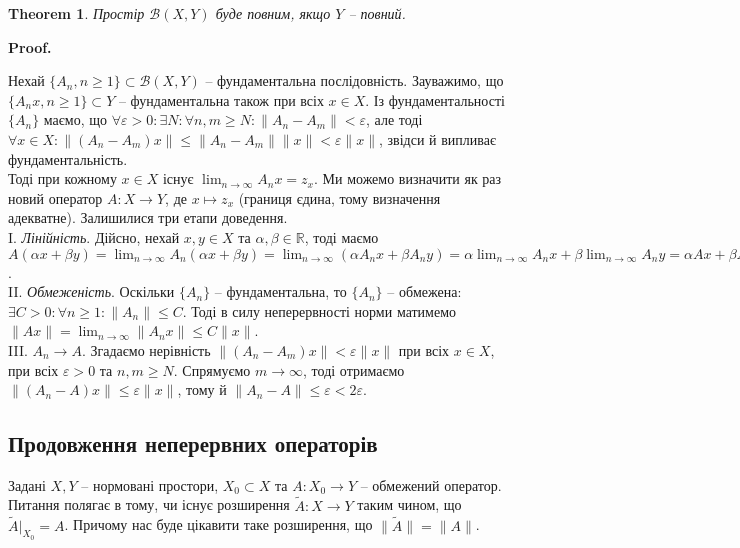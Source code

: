 \documentclass[a4paper, 10pt]{article}
\makeatletter
\theoremstyle{theoremdd}
\newtheorem{theorem}{Theorem}[subsection]
\theoremstyle{theoremdd}
\theoremstyle{theoremdd}
\theoremstyle{theoremdd}
\theoremstyle{theoremdd}
\theoremstyle{theoremdd}
\theoremstyle{theoremdd}
\theoremstyle{theoremdd}
\renewenvironment{proof}[1][Proof.\\]{\par
\pushQED{\hfill \qed}%
\normalfont \topsep6\p@\@plus6\p@\relax
\trivlist
\item\relax
{\bfseries
#1\@addpunct{.}}\hspace\labelsep\ignorespaces
}{%
\popQED\endtrivlist\@endpefalse
}
\makeatother
\begin{document}
\begin{theorem}
Простір $\mathcal{B}(X,Y)$ буде повним, якщо $Y$ -- повний.
\end{theorem}

\begin{proof}
Нехай $\{A_n, n \geq 1\} \subset \mathcal{B}(X,Y)$ -- фундаментальна послідовність. Зауважимо, що $\{A_nx, n \geq 1\} \subset Y$ -- фундаментальна також при всіх $x \in X$. Із фундаментальності $\{A_n\}$ маємо, що $\forall \varepsilon > 0: \exists N: \forall n,m \geq N: \|A_n-A_m\| < \varepsilon$, але тоді $\forall x \in X: \|(A_n-A_m)x\| \leq \|A_n-A_m\| \|x\| < \varepsilon \|x\|$, звідси й випливає фундаментальність.\\
Тоді при кожному $x \in X$ існує $\displaystyle\lim_{n \to \infty} A_n x = z_x$. Ми можемо визначити як раз новий оператор $A \colon X \to Y$, де $x \mapsto z_x$ (границя єдина, тому визначення адекватне). Залишилися три етапи доведення.\\
I. \textit{Лінійність}. \quad Дійсно, нехай $x,y \in X$ та $\alpha,\beta \in \mathbb{R}$, тоді маємо\\
$A(\alpha x + \beta y) = \displaystyle\lim_{n \to \infty} A_n(\alpha x + \beta y) = \lim_{n \to \infty} (\alpha A_nx + \beta A_n y) = \alpha \lim_{n \to \infty} A_n x + \beta \lim_{n \to \infty} A_n y = \alpha Ax + \beta Ay$.\\
II. \textit{Обмеженість}. \quad Оскільки $\{A_n\}$ -- фундаментальна, то $\{A_n\}$ -- обмежена: $\exists C > 0: \forall n \geq 1: \|A_n\| \leq C$. Тоді в силу неперервності норми матимемо $\|Ax\| = \displaystyle\lim_{n \to \infty} \|A_nx\| \leq C \|x\|$.\\
III. \textit{$A_n \to A$}. \quad Згадаємо нерівність $\|(A_n-A_m)x\| < \varepsilon \|x\|$ при всіх $x \in X$, при всіх $\varepsilon > 0$ та $n,m \geq N$. Спрямуємо $m \to \infty$, тоді отримаємо $\|(A_n-A)x\| \leq \varepsilon \|x\|$, тому й $\|A_n-A\| \leq \varepsilon < 2\varepsilon$.
\end{proof}

\subsection{Продовження неперервних операторів}
Задані $X,Y$ -- нормовані простори, $X_0 \subset X$ та $A \colon X_0 \to Y$ -- обмежений оператор. Питання полягає в тому, чи існує розширення $\tilde{A} \colon X \to Y$ таким чином, що $\tilde{A}|_{X_0} = A$. Причому нас буде цікавити таке розширення, що $\|\tilde{A}\| = \|A\|$.
\end{document}
